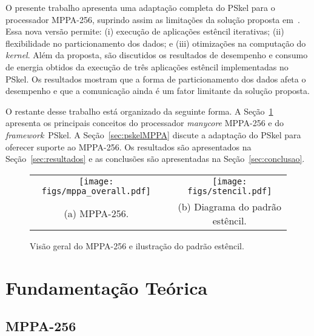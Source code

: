 \documentclass[12pt]{article}
\newcommand{\fw}{\textit{framework}\xspace}
\newcommand{\pskel}{{\small \textsf{PSkel}}\xspace}
\newcommand{\mppa}{{\small \textsf{MPPA-256}}\xspace}
\begin{document}
O presente trabalho apresenta uma adaptação completa do \pskel para o processador \mppa, suprindo assim as limitações da solução proposta em~\cite{Castro-Podesta-ERAD:2016}. Essa nova versão permite: (i) execução de aplicações estêncil iterativas; (ii) flexibilidade no particionamento dos dados; e (iii) otimizações na computação do \textit{kernel}. Além da proposta, são discutidos os resultados de desempenho e consumo de energia obtidos da execução de três aplicações estêncil implementadas no \pskel. Os resultados mostram que a forma de particionamento dos dados afeta o desempenho e que a comunicação ainda é um fator limitante da solução proposta.

O restante desse trabalho está organizado da seguinte forma. A Seção~\ref{sec:fundamentacao} apresenta
os principais conceitos do processador \textit{manycore} \mppa e do \fw \ \pskel.
A Seção~\ref{sec:pskelMPPA} discute a adaptação do \pskel para oferecer suporte ao \mppa.
Os resultados são apresentados na Seção~\ref{sec:resultados} e as conclusões são apresentadas na Seção~\ref{sec:conclusao}.

\begin{figure}[t]
	\begin{center}
		\begin{tabular}{ccc}
			\texttt{[image: figs/mppa\_overall.pdf]} & & \texttt{[image: figs/stencil.pdf]} \\
			(a) \mppa. & \hspace{1cm} & (b) Diagrama do padrão estêncil. \\
		\end{tabular}
      \vspace{-1ex}
		\caption{Visão geral do \mppa e ilustração do padrão estêncil.}
	\end{center}
   \vspace{-2ex}
\label{fig:mppa-pskel}
\end{figure}

\section{Fundamentação Teórica}
\label{sec:fundamentacao}



\subsection{MPPA-256}
\label{subsec:mppa}
\end{document}
